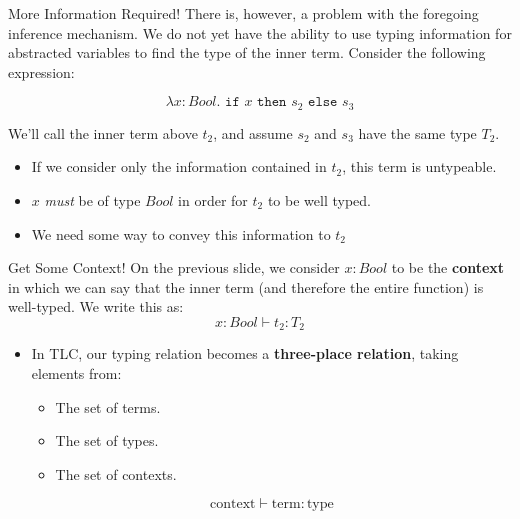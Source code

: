 \documentclass[11pt]{beamer}
\begin{document}
\begin{frame}[fragile=singleslide]{More Information Required!}
There is, however, a problem with the foregoing inference mechanism.  We do not yet have the ability to use typing information for abstracted variables to find the type of the inner term.  Consider the following expression:

\begin{equation}
\lambda x : Bool. \texttt{ if } x \texttt{ then } s_2 \texttt{ else } s_3
\end{equation}

We'll call the inner term above $t_2$, and assume $s_2$ and $s_3$ have the same type $T_2$.  

\begin{itemize}
\item If we consider only the information contained in $t_2$, this term is untypeable.  
\item $x$ \emph{must} be of type $Bool$ in order for $t_2$ to be well typed.  
\item We need some way to convey this information to $t_2$
\end{itemize}
\end{frame}

\begin{frame}[fragile=singleslide]{Get Some Context!}
On the previous slide, we consider $x : Bool$ to be the \textbf{context} in which we can say that the inner term (and therefore the entire function) is well-typed.  We write this as:
\begin{equation}
x : Bool \vdash t_2 : T_2
\end{equation}
\begin{itemize}
\item In TLC, our typing relation becomes a \textbf{three-place relation}, taking elements from:
\begin{itemize}
\item The set of terms.
\item The set of types.
\item The set of contexts.
\end{itemize}
\begin{equation}
\text{context} \vdash \text{term} : \text{type}
\end{equation}
\end{itemize}
\end{frame}
\end{document}
